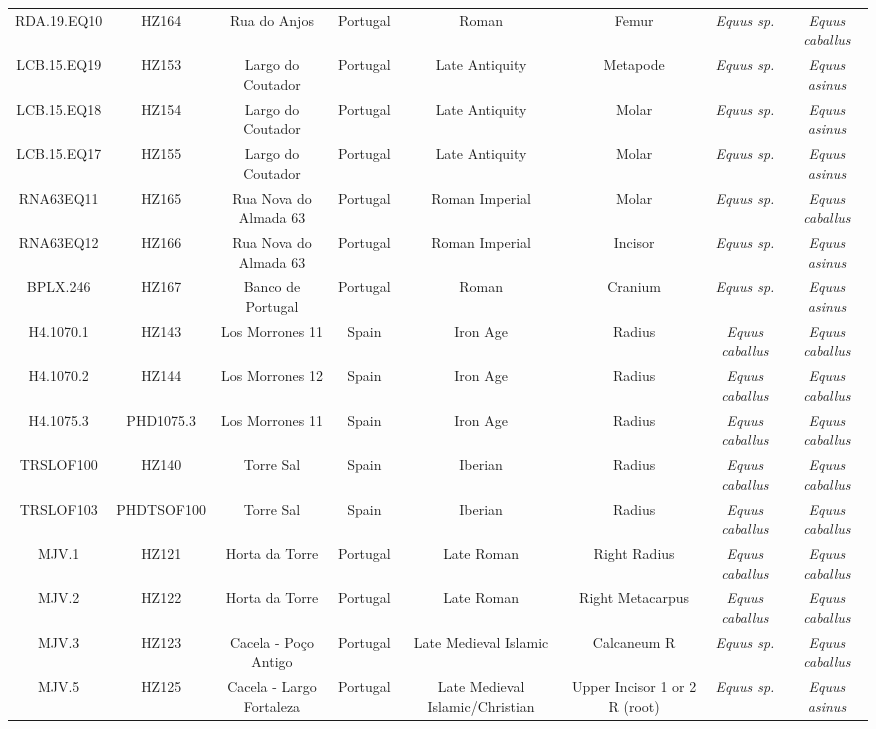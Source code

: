 \documentclass[
]{article}
\begin{document}
\begin{landscape}
\begin{table}
\begin{tabular}[t]{cccccc>{}c>{}c}
RDA.19.EQ10 & HZ164 & Rua do Anjos & Portugal & Roman & Femur & \em{Equus {\normalfont sp.}} & \em{Equus caballus}\\
LCB.15.EQ19 & HZ153 & Largo do Coutador & Portugal & Late Antiquity & Metapode & \em{Equus {\normalfont sp.}} & \em{Equus asinus}\\
LCB.15.EQ18 & HZ154 & Largo do Coutador & Portugal & Late Antiquity & Molar & \em{Equus {\normalfont sp.}} & \em{Equus asinus}\\
LCB.15.EQ17 & HZ155 & Largo do Coutador & Portugal & Late Antiquity & Molar & \em{Equus {\normalfont sp.}} & \em{Equus asinus}\\
RNA63EQ11 & HZ165 & Rua Nova do Almada 63 & Portugal & Roman Imperial & Molar & \em{Equus {\normalfont sp.}} & \em{Equus caballus}\\
RNA63EQ12 & HZ166 & Rua Nova do Almada 63 & Portugal & Roman Imperial & Incisor & \em{Equus {\normalfont sp.}} & \em{Equus asinus}\\
BPLX.246 & HZ167 & Banco de Portugal & Portugal & Roman & Cranium & \em{Equus {\normalfont sp.}} & \em{Equus asinus}\\
H4.1070.1 & HZ143 & Los Morrones 11 & Spain & Iron Age & Radius & \em{Equus caballus} & \em{Equus caballus}\\
H4.1070.2 & HZ144 & Los Morrones 12 & Spain & Iron Age & Radius & \em{Equus caballus} & \em{Equus caballus}\\
H4.1075.3 & PHD1075.3 & Los Morrones 11 & Spain & Iron Age & Radius & \em{Equus caballus} & \em{Equus caballus}\\
TRSLOF100 & HZ140 & Torre Sal & Spain & Iberian & Radius & \em{Equus caballus} & \em{Equus caballus}\\
TRSLOF103 & PHDTSOF100 & Torre Sal & Spain & Iberian & Radius & \em{Equus caballus} & \em{Equus caballus}\\
MJV.1 & HZ121 & Horta da Torre & Portugal & Late Roman & Right Radius & \em{Equus caballus} & \em{Equus caballus}\\
MJV.2 & HZ122 & Horta da Torre & Portugal & Late Roman & Right Metacarpus & \em{Equus caballus} & \em{Equus caballus}\\
MJV.3 & HZ123 & Cacela - Po\c{c}o Antigo & Portugal & Late Medieval Islamic & Calcaneum R & \em{Equus {\normalfont sp.}} & \em{Equus caballus}\\
MJV.5 & HZ125 & Cacela - Largo Fortaleza & Portugal & Late Medieval Islamic/Christian & Upper Incisor 1 or 2 R (root) & \em{Equus {\normalfont sp.}} & \em{Equus asinus}\\

\end{tabular}
\end{table}
\end{landscape}
\end{document}
